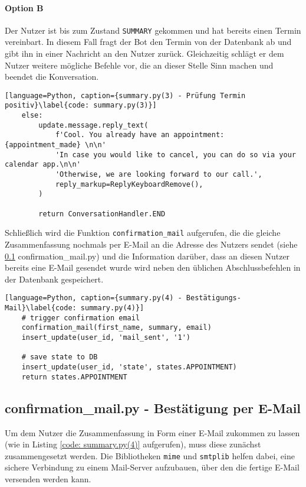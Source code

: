             \paragraph{Option B}
            Der Nutzer ist bis zum Zustand \verb|SUMMARY| gekommen und hat bereits einen Termin vereinbart. In diesem Fall fragt der Bot den Termin von der Datenbank ab und gibt ihn in einer Nachricht an den Nutzer zurück. Gleichzeitig schlägt er dem Nutzer weitere mögliche Befehle vor, die an dieser Stelle Sinn machen und beendet die Konversation.            
            
            \begin{lstlisting}[language=Python, caption={summary.py(3) - Prüfung Termin positiv}\label{code: summary.py(3)}]
    else:
        update.message.reply_text(
            f'Cool. You already have an appointment: {appointment_made} \n\n'
            'In case you would like to cancel, you can do so via your calendar app.\n\n'
            'Otherwise, we are looking forward to our call.',
            reply_markup=ReplyKeyboardRemove(),
        )

        return ConversationHandler.END
            \end{lstlisting}

        Schließlich wird die Funktion \verb|confirmation_mail| aufgerufen, die die gleiche Zusammenfassung nochmals per E-Mail an die Adresse des Nutzers sendet (siehe \ref{Implementierung: confirmation_mail.py} confirmation\_mail.py) und die Information darüber, dass an diesen Nutzer bereits eine E-Mail gesendet wurde wird neben den üblichen Abschlussbefehlen in der Datenbank gespeichert.
            
            \begin{lstlisting}[language=Python, caption={summary.py(4) - Bestätigungs-Mail}\label{code: summary.py(4)}]
    # trigger confirmation email
    confirmation_mail(first_name, summary, email)
    insert_update(user_id, 'mail_sent', '1')

    # save state to DB
    insert_update(user_id, 'state', states.APPOINTMENT)
    return states.APPOINTMENT
            \end{lstlisting}

                    
        \subsection{confirmation\_mail.py - Bestätigung per E-Mail} \label{Implementierung: confirmation_mail.py}
            Um dem Nutzer die Zusammenfassung in Form einer E-Mail zukommen zu lassen (wie in Listing \ref*{code: summary.py(4)} aufgerufen), muss diese zunächst zusammengesetzt werden. Die Bibliotheken \verb|mime| \cite{email.mime} und \verb|smtplib| \cite{smtplib} helfen dabei, eine sichere Verbindung zu einem Mail-Server aufzubauen, über den die fertige E-Mail versenden werden kann.\\


